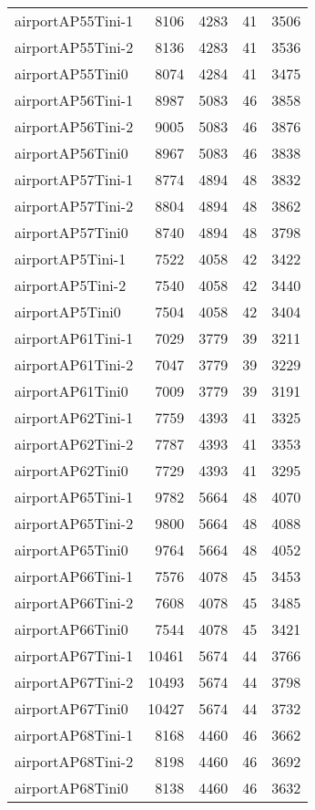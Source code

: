 \begin{longtable}{lrrrr}
airportAP55Tini-1 & 8106 & 4283 & 41 & 3506 \\
airportAP55Tini-2 & 8136 & 4283 & 41 & 3536 \\
airportAP55Tini0 & 8074 & 4284 & 41 & 3475 \\
airportAP56Tini-1 & 8987 & 5083 & 46 & 3858 \\
airportAP56Tini-2 & 9005 & 5083 & 46 & 3876 \\
airportAP56Tini0 & 8967 & 5083 & 46 & 3838 \\
airportAP57Tini-1 & 8774 & 4894 & 48 & 3832 \\
airportAP57Tini-2 & 8804 & 4894 & 48 & 3862 \\
airportAP57Tini0 & 8740 & 4894 & 48 & 3798 \\
airportAP5Tini-1 & 7522 & 4058 & 42 & 3422 \\
airportAP5Tini-2 & 7540 & 4058 & 42 & 3440 \\
airportAP5Tini0 & 7504 & 4058 & 42 & 3404 \\
airportAP61Tini-1 & 7029 & 3779 & 39 & 3211 \\
airportAP61Tini-2 & 7047 & 3779 & 39 & 3229 \\
airportAP61Tini0 & 7009 & 3779 & 39 & 3191 \\
airportAP62Tini-1 & 7759 & 4393 & 41 & 3325 \\
airportAP62Tini-2 & 7787 & 4393 & 41 & 3353 \\
airportAP62Tini0 & 7729 & 4393 & 41 & 3295 \\
airportAP65Tini-1 & 9782 & 5664 & 48 & 4070 \\
airportAP65Tini-2 & 9800 & 5664 & 48 & 4088 \\
airportAP65Tini0 & 9764 & 5664 & 48 & 4052 \\
airportAP66Tini-1 & 7576 & 4078 & 45 & 3453 \\
airportAP66Tini-2 & 7608 & 4078 & 45 & 3485 \\
airportAP66Tini0 & 7544 & 4078 & 45 & 3421 \\
airportAP67Tini-1 & 10461 & 5674 & 44 & 3766 \\
airportAP67Tini-2 & 10493 & 5674 & 44 & 3798 \\
airportAP67Tini0 & 10427 & 5674 & 44 & 3732 \\
airportAP68Tini-1 & 8168 & 4460 & 46 & 3662 \\
airportAP68Tini-2 & 8198 & 4460 & 46 & 3692 \\
airportAP68Tini0 & 8138 & 4460 & 46 & 3632 \\

\end{longtable}
